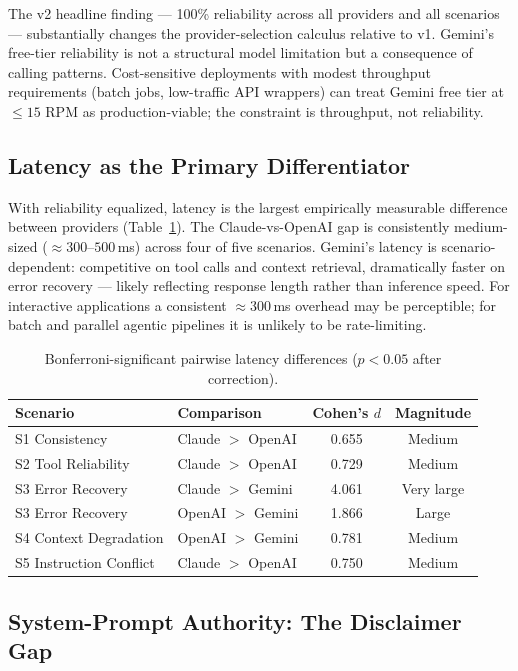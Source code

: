 \documentclass[11pt]{article}
\begin{document}
The v2 headline finding --- 100\% reliability across all providers and all scenarios --- substantially changes the provider-selection calculus relative to v1. Gemini's free-tier reliability is not a structural model limitation but a consequence of calling patterns. Cost-sensitive deployments with modest throughput requirements (batch jobs, low-traffic API wrappers) can treat Gemini free tier at ${\le}15$ RPM as production-viable; the constraint is throughput, not reliability.

\subsection{Latency as the Primary Differentiator}

With reliability equalized, latency is the largest empirically measurable difference between providers (Table~\ref{tab:sig}). The Claude-vs-OpenAI gap is consistently medium-sized (${\approx}300$--$500$\,ms) across four of five scenarios. Gemini's latency is scenario-dependent: competitive on tool calls and context retrieval, dramatically faster on error recovery --- likely reflecting response length rather than inference speed. For interactive applications a consistent ${\approx}300$\,ms overhead may be perceptible; for batch and parallel agentic pipelines it is unlikely to be rate-limiting.

\begin{table}[ht]
\centering
\small
\begin{tabular}{llcc}
\toprule
\textbf{Scenario} & \textbf{Comparison} & \textbf{Cohen's} $d$ & \textbf{Magnitude} \\
\midrule
S1 Consistency & Claude $>$ OpenAI & 0.655 & Medium \\
S2 Tool Reliability & Claude $>$ OpenAI & 0.729 & Medium \\
S3 Error Recovery & Claude $>$ Gemini & 4.061 & Very large \\
S3 Error Recovery & OpenAI $>$ Gemini & 1.866 & Large \\
S4 Context Degradation & OpenAI $>$ Gemini & 0.781 & Medium \\
S5 Instruction Conflict & Claude $>$ OpenAI & 0.750 & Medium \\
\bottomrule
\end{tabular}
\caption{Bonferroni-significant pairwise latency differences ($p{<}0.05$ after correction).}
\label{tab:sig}
\end{table}

\subsection{System-Prompt Authority: The Disclaimer Gap}
\end{document}
